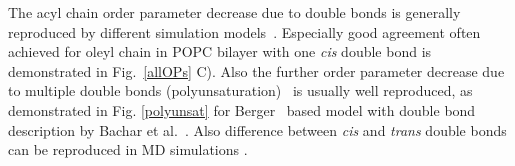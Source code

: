 \documentclass[aps,prl,superscriptaddress,twocolumn]{revtex4}
\begin{document}
The acyl chain order parameter decrease due to double bonds is generally reproduced by different simulation 
models~\cite{hyvonen97,hyvonen97b,feller97,saiz01,huber02,feller02,bachar04,rog04,hyvonen05,ollila07a,dickson12,klauda10,klauda12,ferreira13,jambeck13,lee14,dickson14}. 
Especially good agreement often achieved for oleyl chain in POPC bilayer with one {\it cis} double bond is demonstrated in Fig.~\ref{allOPs} C).
Also the further order parameter decrease due to multiple double bonds (polyunsaturation)~\cite{hyvonen97,hyvonen97b,saiz01,huber02,feller02,bachar04,hyvonen05,ollila07a,klauda12} 
is usually well reproduced, as demonstrated in Fig. \ref{polyunsat} for Berger~\cite{berger97} based model with double bond description by Bachar et al.~\cite{bachar04}.
Also difference between {\it cis} and {\it trans} double bonds can be reproduced in MD simulations \cite{kulig15b}.
\end{document}
